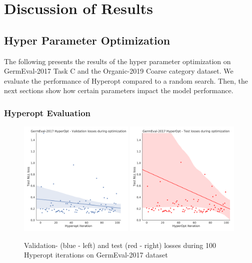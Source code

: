 \chapter{Discussion of Results}
\label{ch:discussion}


\section{Hyper Parameter Optimization}

The following presents the results of the hyper parameter optimization on GermEval-2017 Task C and the Organic-2019 Coarse category dataset. We evaluate the performance of Hyperopt compared to a random search. Then, the next sections show how certain parameters impact the model performance. 

\subsection{Hyperopt Evaluation}

\begin{figure}[ht]
	\centering
	\includegraphics[width=0.49\textwidth]{figures/06_results/06_hp_ge_lm_loss-iteration_validation}
	\includegraphics[width=0.49\textwidth]{figures/06_results/06_hp_ge_lm_loss-iteration_test}
	\caption{Validation- {(blue - left)} and test {(red - right)} losses during 100 Hyperopt iterations on GermEval-2017 dataset}
	\label{fig:06_ValidationLossGermEvalHp}
\end{figure}

